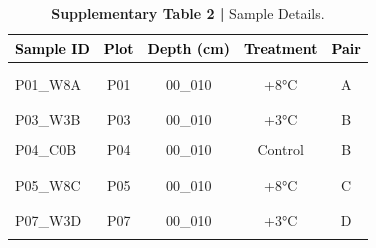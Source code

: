 \documentclass[
  10pt,
  letterpaper,
  DIV=11,
  numbers=noendperiod]{scrartcl}
\begin{document}
\begin{table}[H]
\caption{\textbf{Supplementary Table 2 |} Sample Details.}
\centering
\fontsize{8}{10}\selectfont
\begin{tabular}[t]{lcccc}
\toprule
\textcolor{black}{\textbf{Sample ID}} & \textcolor{black}{\textbf{Plot}} & \textcolor{black}{\textbf{Depth (cm)}} & \textcolor{black}{\textbf{Treatment}} & \textcolor{black}{\textbf{Pair}}\\
\midrule
\addlinespace[-0.3em]
\multicolumn{5}{l}{\textbf{}}\\
\hspace{1em}\cellcolor{gray!6}{P01\_W3A} & \cellcolor{gray!6}{P01} & \cellcolor{gray!6}{00\_010} & \cellcolor{gray!6}{+3°C} & \cellcolor{gray!6}{A}\\
\hspace{1em}P01\_W8A & P01 & 00\_010 & +8°C & A\\
\hspace{1em}\cellcolor{gray!6}{P02\_C0A} & \cellcolor{gray!6}{P02} & \cellcolor{gray!6}{00\_010} & \cellcolor{gray!6}{Control} & \cellcolor{gray!6}{A}\\
\addlinespace[-0.3em]
\multicolumn{5}{l}{\textbf{}}\\
\hspace{1em}P03\_W3B & P03 & 00\_010 & +3°C & B\\
\hspace{1em}\cellcolor{gray!6}{P03\_W8B} & \cellcolor{gray!6}{P03} & \cellcolor{gray!6}{00\_010} & \cellcolor{gray!6}{+8°C} & \cellcolor{gray!6}{B}\\
\hspace{1em}P04\_C0B & P04 & 00\_010 & Control & B\\
\addlinespace[-0.3em]
\multicolumn{5}{l}{\textbf{}}\\
\hspace{1em}\cellcolor{gray!6}{P05\_W3C} & \cellcolor{gray!6}{P05} & \cellcolor{gray!6}{00\_010} & \cellcolor{gray!6}{+3°C} & \cellcolor{gray!6}{C}\\
\hspace{1em}P05\_W8C & P05 & 00\_010 & +8°C & C\\
\hspace{1em}\cellcolor{gray!6}{P06\_C0C} & \cellcolor{gray!6}{P06} & \cellcolor{gray!6}{00\_010} & \cellcolor{gray!6}{Control} & \cellcolor{gray!6}{C}\\
\addlinespace[-0.3em]
\multicolumn{5}{l}{\textbf{}}\\
\hspace{1em}P07\_W3D & P07 & 00\_010 & +3°C & D\\
\hspace{1em}\cellcolor{gray!6}{P07\_W8D} & \cellcolor{gray!6}{P07} & \cellcolor{gray!6}{00\_010} & \cellcolor{gray!6}{+8°C} & \cellcolor{gray!6}{D}\\

\end{tabular}
\end{table}
\end{document}
